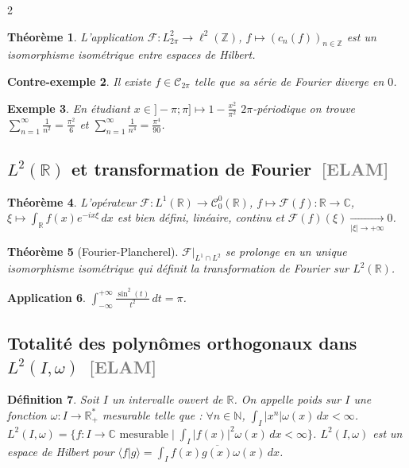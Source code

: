 \documentclass[10pt,a4paper]{article}
\theoremstyle{plan}
\newtheorem{theoreme}{Théorème}
\newtheorem{definition}[theoreme]{Définition}
\newtheorem{application}[theoreme]{Application}
\newtheorem{exemple}[theoreme]{Exemple}
\newtheorem{contreexemple}[theoreme]{Contre-exemple}
\theoremstyle{planex}   %
\newcommand{\srcs}[1]{\ {\normalfont\small\textcolor{gray}{[#1]}}}
\newcommand{\R}{\mathbb{R}}
\newcommand{\C}{\mathbb{C}}
\newcommand{\N}{\mathbb{N}}
\newcommand{\Z}{\mathbb{Z}}
\newcommand{\Cc}{\mathcal{C}}
\newcommand{\Ff}{\mathcal{F}}
\newcommand{\abs}[1]{\left\lvert #1\right\rvert}
\begin{document}
\begin{multicols}{2}
\begin{theoreme}
L'application $\mathcal{F} : L^2_{2\pi} \to \ell^2(\Z)$, $f \mapsto (c_n(f))_{n \in \Z}$ est un isomorphisme isométrique entre espaces de Hilbert.
\end{theoreme}

\begin{contreexemple}
Il existe $f \in \Cc_{2\pi}$ telle que sa série de Fourier diverge en $0$.
\end{contreexemple}

\begin{exemple}
En étudiant $x \in ]-\pi;\pi] \mapsto 1 - \frac{x^2}{\pi^2}$ $2\pi$-périodique on trouve $\sum_{n=1}^{\infty} \frac{1}{n^2} = \frac{\pi^2}{6}$ et $\sum_{n=1}^{\infty} \frac{1}{n^4} = \frac{\pi^4}{90}$.
\end{exemple}

\subsection{$L^2(\R)$ et transformation de Fourier\srcs{ELAM}}

\begin{theoreme}
L'opérateur $\Ff : L^1(\R) \to \Cc^0_0(\R)$, $f \mapsto \Ff(f) : \R \to \C$, $\xi \mapsto \int_\R f(x) e^{-ix\xi}\,dx$ est bien défini, linéaire, continu et $\Ff(f)(\xi) \xrightarrow[\abs{\xi} \to +\infty]{} 0$.
\end{theoreme}

\begin{theoreme}[Fourier-Plancherel]
$\Ff|_{L^1 \cap L^2}$ se prolonge en un unique isomorphisme isométrique qui définit la transformation de Fourier sur $L^2(\R)$.
\end{theoreme}

\begin{application}
$\displaystyle \int_{-\infty}^{+\infty} \frac{\sin^2(t)}{t^2}\,dt = \pi$.
\end{application}

\subsection{Totalité des polynômes orthogonaux dans $L^2(I,\omega)$\srcs{ELAM}}

\begin{definition} %
Soit $I$ un intervalle ouvert de $\R$. On appelle poids sur $I$ une fonction $\omega : I \to \R_+^*$ mesurable telle que : $\forall n \in \N$, $\int_I \abs{x^n} \omega(x)\,dx < \infty$. $L^2(I,\omega) = \{ f : I \to \C \text{ mesurable} \mid \int_I \abs{f(x)}^2 \omega(x)\,dx < \infty \}$. $L^2(I,\omega)$ est un espace de Hilbert pour $\langle f | g \rangle = \int_I f(x) \overline{g(x)} \omega(x)\,dx$.
\end{definition}


\end{multicols}
\end{document}
